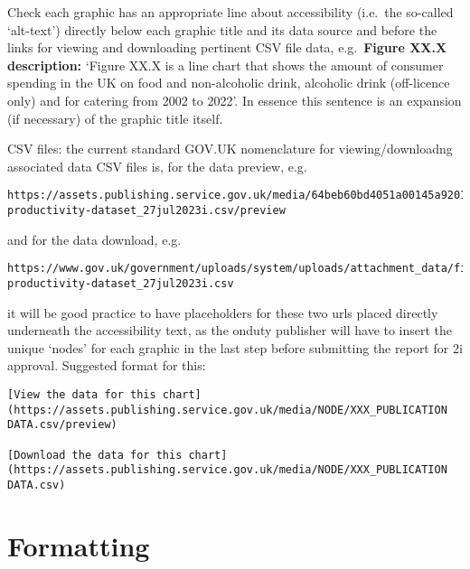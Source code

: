 \documentclass[
]{book}
\begin{document}
Check each graphic has an appropriate line about accessibility (i.e.~the so-called `alt-text') directly below each graphic title and its data source and before the links for viewing and downloading pertinent CSV file data, e.g.~\textbf{Figure XX.X description:} `Figure XX.X is a line chart that shows the amount of consumer spending in the UK on food and non-alcoholic drink, alcoholic drink (off-licence only) and for catering from 2002 to 2022'. In essence this sentence is an expansion (if necessary) of the graphic title itself.

CSV files: the current standard GOV.UK nomenclature for viewing/downloadng associated data CSV files is, for the data preview, e.g.~

\begin{verbatim}
https://assets.publishing.service.gov.uk/media/64beb60bd4051a00145a9201/foodchainanalysis-productivity-dataset_27jul2023i.csv/preview
\end{verbatim}

and for the data download, e.g.

\begin{verbatim}
https://www.gov.uk/government/uploads/system/uploads/attachment_data/file/1173363/foodchainanalysis-productivity-dataset_27jul2023i.csv
\end{verbatim}

it will be good practice to have placeholders for these two urls placed directly underneath the accessibility text, as the onduty publisher will have to insert the unique `nodes' for each graphic in the last step before submitting the report for 2i approval. Suggested format for this:

\begin{verbatim}
[View the data for this chart](https://assets.publishing.service.gov.uk/media/NODE/XXX_PUBLICATION DATA.csv/preview)  

[Download the data for this chart](https://assets.publishing.service.gov.uk/media/NODE/XXX_PUBLICATION DATA.csv)
\end{verbatim}

\hypertarget{formatting}{%
\section{Formatting}\label{formatting}}
\end{document}
